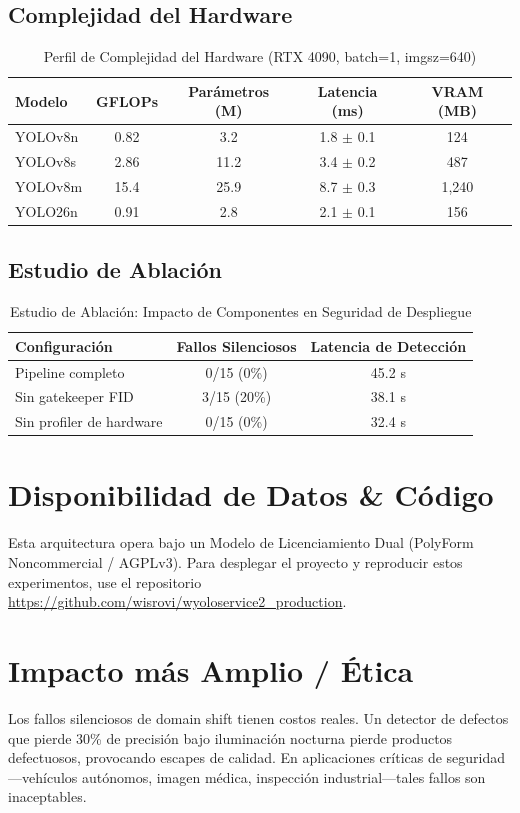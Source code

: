 \documentclass[10pt,twocolumn,letterpaper]{article}
\begin{document}
\subsection{Complejidad del Hardware}
\begin{table}[htbp]
\centering
\caption{Perfil de Complejidad del Hardware (RTX 4090, batch=1, imgsz=640)}
\label{tab:hardware}
\begin{tabular}{@{}lcccc@{}}
\toprule
\textbf{Modelo} & \textbf{GFLOPs} & \textbf{Parámetros (M)} & \textbf{Latencia (ms)} & \textbf{VRAM (MB)} \\ \midrule
YOLOv8n & 0.82 & 3.2 & 1.8 $\pm$ 0.1 & 124 \\
YOLOv8s & 2.86 & 11.2 & 3.4 $\pm$ 0.2 & 487 \\
YOLOv8m & 15.4 & 25.9 & 8.7 $\pm$ 0.3 & 1,240 \\
YOLO26n & 0.91 & 2.8 & 2.1 $\pm$ 0.1 & 156 \\
\bottomrule
\end{tabular}
\end{table}

\subsection{Estudio de Ablación}
\begin{table}[htbp]
\centering
\caption{Estudio de Ablación: Impacto de Componentes en Seguridad de Despliegue}
\label{tab:ablation}
\begin{tabular}{@{}lcc@{}}
\toprule
\textbf{Configuración} & \textbf{Fallos Silenciosos} & \textbf{Latencia de Detección} \\ \midrule
Pipeline completo & 0/15 (0\%) & 45.2 s \\
Sin gatekeeper FID & 3/15 (20\%) & 38.1 s \\
Sin profiler de hardware & 0/15 (0\%) & 32.4 s \\
\bottomrule
\end{tabular}
\end{table}

\section{Disponibilidad de Datos \& Código}
Esta arquitectura opera bajo un Modelo de Licenciamiento Dual (PolyForm Noncommercial / AGPLv3). Para desplegar el proyecto y reproducir estos experimentos, use el repositorio \url{https://github.com/wisrovi/wyoloservice2\_production}.

\section{Impacto más Amplio / Ética}
Los fallos silenciosos de domain shift tienen costos reales. Un detector de defectos que pierde 30\% de precisión bajo iluminación nocturna pierde productos defectuosos, provocando escapes de calidad. En aplicaciones críticas de seguridad---vehículos autónomos, imagen médica, inspección industrial---tales fallos son inaceptables.
\end{document}
